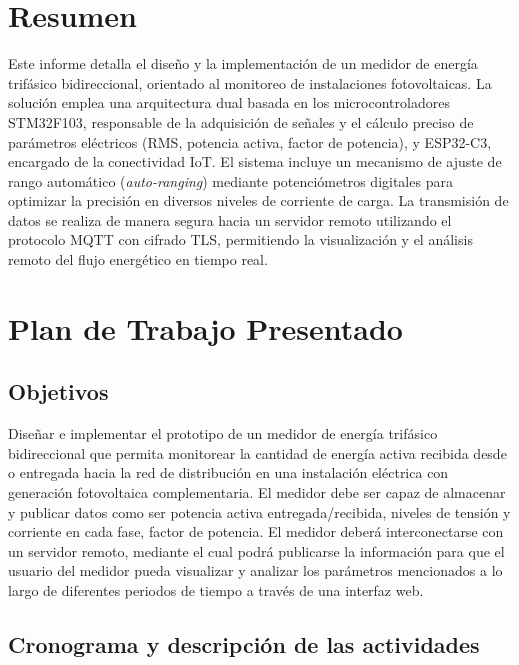 \documentclass[12pt, a4paper]{article} %
\begin{document}

\newpage
\tableofcontents
\newpage

\section{Resumen}

Este informe detalla el diseño y la implementación de un medidor de energía trifásico bidireccional, orientado al monitoreo de instalaciones fotovoltaicas. La solución emplea una arquitectura dual basada en los microcontroladores STM32F103, responsable de la adquisición de señales y el cálculo preciso de parámetros eléctricos (RMS, potencia activa, factor de potencia), y ESP32-C3, encargado de la conectividad IoT. El sistema incluye un mecanismo de ajuste de rango automático (\textit{auto-ranging}) mediante potenciómetros digitales para optimizar la precisión en diversos niveles de corriente de carga. La transmisión de datos se realiza de manera segura hacia un servidor remoto utilizando el protocolo MQTT con cifrado TLS, permitiendo la visualización y el análisis remoto del flujo energético en tiempo real.

\section{Plan de Trabajo Presentado}

\subsection{Objetivos}

Diseñar e implementar el prototipo de un medidor de energía trifásico bidireccional que permita monitorear la cantidad de energía activa recibida desde o entregada hacia la red de distribución en una instalación eléctrica con generación fotovoltaica complementaria. El medidor debe ser capaz de almacenar y publicar datos como ser potencia activa entregada/recibida, niveles de tensión y corriente en cada fase, factor de potencia. El medidor deberá interconectarse con un servidor remoto, mediante el cual podrá publicarse la información para que el usuario del medidor pueda visualizar y analizar los parámetros mencionados a lo largo de diferentes periodos de tiempo a través de una interfaz web.

\subsection{Cronograma y descripción de las actividades}
\end{document}
